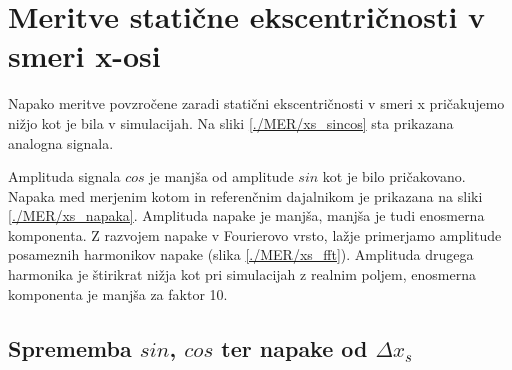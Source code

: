 \newpage
\section{Meritve statične ekscentričnosti v smeri x-osi}

Napako meritve povzročene zaradi statični ekscentričnosti v smeri x pričakujemo nižjo kot je bila v simulacijah. Na sliki \ref{./MER/xs_sincos} sta prikazana analogna signala. 


Amplituda signala $cos$ je manjša od amplitude $sin$ kot je bilo pričakovano. Napaka med merjenim kotom in referenčnim dajalnikom je prikazana na sliki \ref{./MER/xs_napaka}. Amplituda napake je manjša, manjša je tudi enosmerna komponenta. Z razvojem napake v Fourierovo vrsto, lažje primerjamo amplitude posameznih harmonikov napake (slika \ref{./MER/xs_fft}). Amplituda drugega harmonika je štirikrat nižja kot pri simulacijah z realnim poljem, enosmerna komponenta je manjša za faktor 10.




\subsection{Sprememba $sin$, $cos$ ter napake od $\Delta x_s$}

